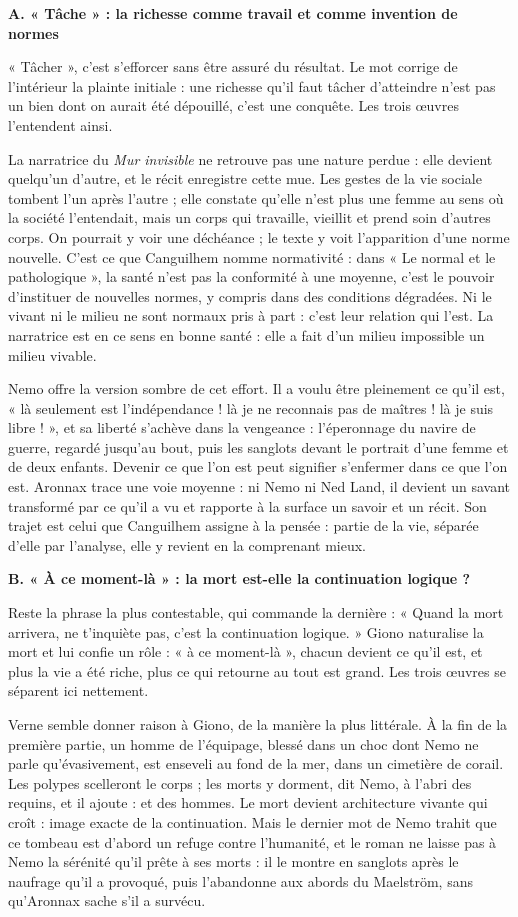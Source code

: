 \documentclass[11pt,a4paper]{article}
\begin{document}
\textbf{A. « Tâche » : la richesse comme travail et comme invention de normes}

« Tâcher », c'est s'efforcer sans être assuré du résultat. Le mot corrige de l'intérieur la plainte initiale : une richesse qu'il faut tâcher d'atteindre n'est pas un bien dont on aurait été dépouillé, c'est une conquête. Les trois œuvres l'entendent ainsi.

La narratrice du \emph{Mur invisible} ne retrouve pas une nature perdue : elle devient quelqu'un d'autre, et le récit enregistre cette mue. Les gestes de la vie sociale tombent l'un après l'autre ; elle constate qu'elle n'est plus une femme au sens où la société l'entendait, mais un corps qui travaille, vieillit et prend soin d'autres corps. On pourrait y voir une déchéance ; le texte y voit l'apparition d'une norme nouvelle. C'est ce que Canguilhem nomme normativité : dans « Le normal et le pathologique », la santé n'est pas la conformité à une moyenne, c'est le pouvoir d'instituer de nouvelles normes, y compris dans des conditions dégradées. Ni le vivant ni le milieu ne sont normaux pris à part : c'est leur relation qui l'est. La narratrice est en ce sens en bonne santé : elle a fait d'un milieu impossible un milieu vivable.

Nemo offre la version sombre de cet effort. Il a voulu être pleinement ce qu'il est, « là seulement est l'indépendance ! là je ne reconnais pas de maîtres ! là je suis libre ! », et sa liberté s'achève dans la vengeance : l'éperonnage du navire de guerre, regardé jusqu'au bout, puis les sanglots devant le portrait d'une femme et de deux enfants. Devenir ce que l'on est peut signifier s'enfermer dans ce que l'on est. Aronnax trace une voie moyenne : ni Nemo ni Ned Land, il devient un savant transformé par ce qu'il a vu et rapporte à la surface un savoir et un récit. Son trajet est celui que Canguilhem assigne à la pensée : partie de la vie, séparée d'elle par l'analyse, elle y revient en la comprenant mieux.

\textbf{B. « À ce moment-là » : la mort est-elle la continuation logique ?}

Reste la phrase la plus contestable, qui commande la dernière : « Quand la mort arrivera, ne t'inquiète pas, c'est la continuation logique. » Giono naturalise la mort et lui confie un rôle : « à ce moment-là », chacun devient ce qu'il est, et plus la vie a été riche, plus ce qui retourne au tout est grand. Les trois œuvres se séparent ici nettement.

Verne semble donner raison à Giono, de la manière la plus littérale. À la fin de la première partie, un homme de l'équipage, blessé dans un choc dont Nemo ne parle qu'évasivement, est enseveli au fond de la mer, dans un cimetière de corail. Les polypes scelleront le corps ; les morts y dorment, dit Nemo, à l'abri des requins, et il ajoute : et des hommes. Le mort devient architecture vivante qui croît : image exacte de la continuation. Mais le dernier mot de Nemo trahit que ce tombeau est d'abord un refuge contre l'humanité, et le roman ne laisse pas à Nemo la sérénité qu'il prête à ses morts : il le montre en sanglots après le naufrage qu'il a provoqué, puis l'abandonne aux abords du Maelström, sans qu'Aronnax sache s'il a survécu.
\end{document}
